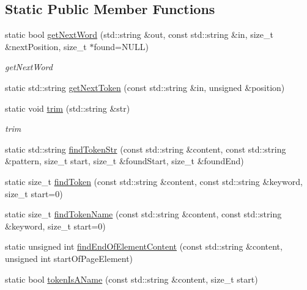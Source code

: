 \subsection*{Static Public Member Functions}
\begin{DoxyCompactItemize}
\item 
static bool \hyperlink{classmerge__lib_1_1_parser_aea1235b1ef3c67048cc9f32ecb30918a}{get\-Next\-Word} (std\-::string \&out, const std\-::string \&in, size\-\_\-t \&next\-Position, size\-\_\-t $\ast$found=N\-U\-L\-L)
\begin{DoxyCompactList}\small\item\em get\-Next\-Word \end{DoxyCompactList}\item 
static std\-::string \hyperlink{classmerge__lib_1_1_parser_a9e91332f7f45b04ce4753c03c8ff4de5}{get\-Next\-Token} (const std\-::string \&in, unsigned \&position)
\item 
static void \hyperlink{classmerge__lib_1_1_parser_a89825c31c50fa949dab5b0b4974b7677}{trim} (std\-::string \&str)
\begin{DoxyCompactList}\small\item\em trim \end{DoxyCompactList}\item 
static std\-::string \hyperlink{classmerge__lib_1_1_parser_a8137716311af63522dd38cad79fc4a40}{find\-Token\-Str} (const std\-::string \&content, const std\-::string \&pattern, size\-\_\-t start, size\-\_\-t \&found\-Start, size\-\_\-t \&found\-End)
\item 
static size\-\_\-t \hyperlink{classmerge__lib_1_1_parser_a10e184b6efbae358d74f48f92406b679}{find\-Token} (const std\-::string \&content, const std\-::string \&keyword, size\-\_\-t start=0)
\item 
static size\-\_\-t \hyperlink{classmerge__lib_1_1_parser_a1238dc538fd46f2cbd5c14f5d9fc9f86}{find\-Token\-Name} (const std\-::string \&content, const std\-::string \&keyword, size\-\_\-t start=0)
\item 
static unsigned int \hyperlink{classmerge__lib_1_1_parser_a9745f8e44623eeb8d93a4a1c0043df33}{find\-End\-Of\-Element\-Content} (const std\-::string \&content, unsigned int start\-Of\-Page\-Element)
\item 
static bool \hyperlink{classmerge__lib_1_1_parser_a61797498a85480de8552462bde30e29a}{token\-Is\-A\-Name} (const std\-::string \&content, size\-\_\-t start)
\end{DoxyCompactItemize}
